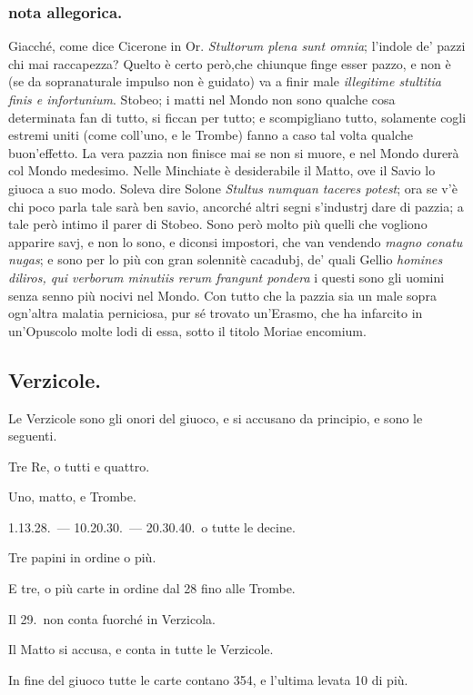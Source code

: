 \documentclass[11pt,a6paper]{article}
\begin{document}
\subsubsection{nota allegorica.}
{\footnotesize
Giacché, come dice Cicerone in Or. \textit{Stultorum
 plena sunt omnia}; l'indole de' pazzi chi mai
raccapezza? Quelto è certo però,che chiunque finge esser
pazzo, e non è (se da sopranaturale impulso non è
guidato) va a finir male \textit{illegitime stultitia finis e
infortunium}. Stobeo; i matti nel Mondo non sono
qualche cosa determinata fan di tutto, si ficcan per
tutto; e scompigliano tutto, solamente cogli
estremi uniti (come coll'uno, e le Trombe) fanno a
caso tal volta qualche buon'effetto. La vera pazzia
non finisce mai se non si muore, e nel Mondo durerà
col Mondo medesimo. Nelle Minchiate è desiderabile
il Matto, ove il Savio lo giuoca a suo modo.
Soleva dire Solone \textit{Stultus numquan taceres
potest}; ora se v'è chi poco parla tale sarà ben savio,
ancorché altri segni s'industrj dare di pazzia; a tale
però intimo il parer di Stobeo. Sono però molto
più quelli che vogliono apparire savj, e non lo sono,
e diconsi impostori, che van vendendo \textit{magno
conatu nugas}; e sono per lo più con gran solennitè
cacadubj, de' quali Gellio \textit{homines diliros, qui
 verborum minutiis rerum frangunt pondera} i questi
sono gli uomini senza senno più nocivi nel Mondo.
Con tutto che la pazzia sia un male sopra ogn'altra
malatia perniciosa, pur sé trovato un'Erasmo,
che ha infarcito in un'Opuscolo molte lodi di essa,
sotto il titolo Moriae encomium.
}
\subsection{Verzicole.}

Le Verzicole sono gli onori del giuoco, e
si accusano da principio, e sono le
seguenti.

Tre Re, o tutti e quattro.

Uno, matto,
e Trombe.

1.13.28.\ — 10.20.30.\ — 20.30.40.\ o
tutte le decine.

Tre papini in ordine o più.

E tre, o più carte in ordine dal 28 fino
alle Trombe.

Il 29.\ non conta fuorché in Verzicola.

Il Matto si accusa, e conta in tutte le
Verzicole.

In fine del giuoco tutte le carte contano
354, e l'ultima levata 10 di più.
\end{document}

